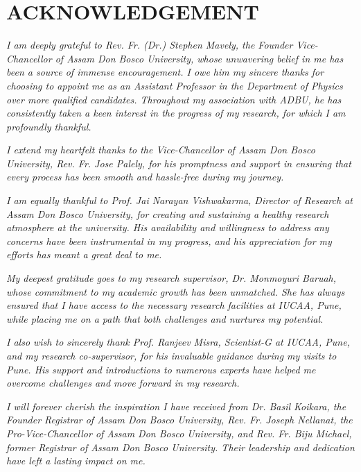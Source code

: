 \chapter*{ACKNOWLEDGEMENT}
    \def\baselinestretch{1.0}
    \par\textsl{I am deeply grateful to Rev. Fr. (Dr.) Stephen Mavely, the Founder Vice-Chancellor of Assam Don Bosco University, whose unwavering belief in me has been a source of immense encouragement. I owe him my sincere thanks for choosing to appoint me as an Assistant Professor in the Department of Physics over more qualified candidates. Throughout my association with ADBU, he has consistently taken a keen interest in the progress of my research, for which I am profoundly thankful.}
    
    \par\textsl{I extend my heartfelt thanks to the Vice-Chancellor of Assam Don Bosco University, Rev. Fr. Jose Palely, for his promptness and support in ensuring that every process has been smooth and hassle-free during my journey.}
    
    \par\textsl{I am equally thankful to Prof. Jai Narayan Vishwakarma, Director of Research at Assam Don Bosco University, for creating and sustaining a healthy research atmosphere at the university. His availability and willingness to address any concerns have been instrumental in my progress, and his appreciation for my efforts has meant a great deal to me.}
    
    \par\textsl{My deepest gratitude goes to my research supervisor, Dr. Monmoyuri Baruah, whose commitment to my academic growth has been unmatched. She has always ensured that I have access to the necessary research facilities at IUCAA, Pune, while placing me on a path that both challenges and nurtures my potential.}
    
    \par\textsl{I also wish to sincerely thank Prof. Ranjeev Misra, Scientist-G at IUCAA, Pune, and my research co-supervisor, for his invaluable guidance during my visits to Pune. His support and introductions to numerous experts have helped me overcome challenges and move forward in my research.}
    
    \par\textsl{I will forever cherish the inspiration I have received from Dr. Basil Koikara, the Founder Registrar of Assam Don Bosco University, Rev. Fr. Joseph Nellanat, the Pro-Vice-Chancellor of Assam Don Bosco University, and Rev. Fr. Biju Michael, former Registrar of Assam Don Bosco University. Their leadership and dedication have left a lasting impact on me.}

